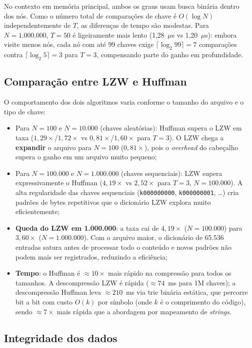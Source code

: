 \documentclass{ifpr-pinhais}
\begin{document}
No contexto em memória principal, ambos os graus usam busca binária dentro dos nós. Como o número total de comparações de chave é $O(\log N)$ independentemente de $T$, as diferenças de tempo são modestas. Para $N = 1.000.000$, $T = 50$ é ligeiramente mais lento (1,28~$\mu$s vs 1,20~$\mu$s): embora visite menos nós, cada nó com até 99 chaves exige $\lceil\log_2 99\rceil = 7$ comparações contra $\lceil\log_2 5\rceil = 3$ para $T = 3$, compensando parte do ganho em profundidade.

\subsection{Comparação entre LZW e Huffman}

O comportamento dos dois algoritmos varia conforme o tamanho do arquivo e o tipo de chave:

\begin{itemize}
    \item Para $N = 100$ e $N = 10.000$ (chaves aleatórias): Huffman supera o LZW em taxa ($1{,}29\times$/$1{,}72\times$ vs $0{,}81\times$/$1{,}60\times$ para $T=3$). O LZW chega a \textbf{expandir} o arquivo para $N = 100$ ($0{,}81\times$), pois o \textit{overhead} do cabeçalho supera o ganho em um arquivo muito pequeno;
    \item Para $N = 100.000$ e $N = 1.000.000$ (chaves sequenciais): LZW supera expressivamente o Huffman ($4{,}19\times$ vs $2{,}52\times$ para $T=3$, $N=100.000$). A alta regularidade das chaves sequenciais (\texttt{k000000000}, \texttt{k000000001}, \ldots) cria padrões de bytes repetitivos que o dicionário LZW explora muito eficientemente;
    \item \textbf{Queda do LZW em 1.000.000}: a taxa cai de $4{,}19\times$ ($N=100.000$) para $3{,}60\times$ ($N=1.000.000$). Com o arquivo maior, o dicionário de 65.536 entradas satura antes de processar todo o conteúdo e novos padrões não podem mais ser registrados, reduzindo a eficiência;
    \item \textbf{Tempo}: o Huffman é $\approx 10\times$ mais rápido na compressão para todos os tamanhos. A descompressão LZW é rápida ($\approx 74$~ms para 1M chaves); a descompressão Huffman leva $\approx 210$~ms via trie binária estática, que percorre bit a bit com custo $O(k)$ por símbolo (onde $k$ é o comprimento do código), sendo $\approx 7\times$ mais rápida que a abordagem por mapeamento de \textit{strings}.
\end{itemize}

\subsection{Integridade dos dados}
\end{document}
